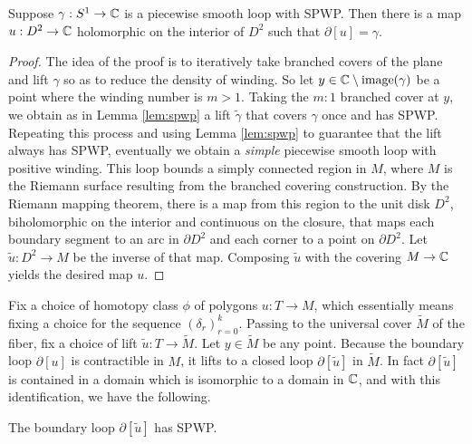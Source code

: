 \documentclass[12pt]{amsart}
\begin{document}
\begin{lemma}
  \label{lem:spwp-mapping}
  Suppose $\gamma: S^1 \to \mathbb{C}$ is a piecewise smooth loop with
  SPWP. Then there is a map $u:D^2 \to \mathbb{C}$ holomorphic on the interior of $D^2$ such that
  $\partial[u] = \gamma$.
\end{lemma}
\begin{proof}
  The idea of the proof is to iteratively take branched covers of the
  plane and lift $\gamma$ so as to reduce the density of winding. So
  let $y \in \mathbb{C} \setminus \operatorname{image}(\gamma)$ be a point where the winding
  number is $m > 1$. Taking the $m:1$ branched cover at $y$, we obtain
  as in Lemma \ref{lem:spwp} a lift $\tilde{\gamma}$ that covers
  $\gamma$ once and has SPWP. Repeating this process and using Lemma
  \ref{lem:spwp} to guarantee that the lift always has SPWP,
  eventually we obtain a \emph{simple} piecewise smooth loop with
  positive winding. This loop bounds a simply connected region in $M$, where $M$ is the Riemann surface resulting
  from the branched covering construction. By the Riemann mapping theorem, there is a map from this region to the unit disk $D^2$, biholomorphic on the interior and continuous on the closure, that maps each boundary segment to an arc in $\partial D^2$ and each corner to a point on $\partial D^2$. Let $\tilde{u} : D^2 \to M$ be the inverse of that map. Composing $\tilde{u}$ with
  the covering $M \to \mathbb{C}$ yields the desired map $u$.
\end{proof}

Fix a choice of homotopy class $\phi$ of polygons $u: T\to M$, which
essentially means fixing a choice for the sequence
$(\delta_r)_{r=0}^k$. Passing to the universal cover $\tilde{M}$ of
the fiber, fix a choice of lift $\tilde{u}:T \to \tilde{M}$. Let $y
\in \tilde{M}$ be any point. Because the boundary loop $\partial[u]$
is contractible in $M$, it lifts to a closed loop
$\partial[\tilde{u}]$ in $\tilde{M}$. In fact $\partial[\tilde{u}]$ is
contained in a domain which is isomorphic to a domain in $\mathbb{C}$, and with
this identification, we have the following.

\begin{lemma}
  \label{lem:positive-winding}
  The boundary loop $\partial[\tilde{u}]$ has SPWP.
\end{lemma}
\end{document}
